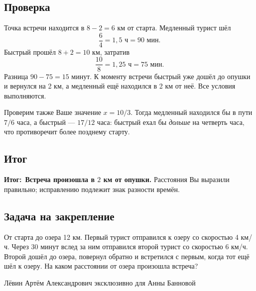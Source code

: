 \documentclass[a4paper,12pt]{article}
\newcommand{\resultlabel}{\textcolor{accent}{\textbf{Итог:}}}
\newcommand{\footerline}{%
  \par\vfill\begin{center}\small\color{muted}
  Лёвин Артём Александрович эксклюзивно для Анны Банновой
  \end{center}}
\begin{document}
\subsection*{Проверка}
Точка встречи находится в $8-2=6$ км от старта. Медленный турист шёл
\[
 \frac64=1{,}5\text{ ч}=90\text{ мин}.
\]
Быстрый прошёл $8+2=10$ км, затратив
\[
 \frac{10}{8}=1{,}25\text{ ч}=75\text{ мин}.
\]
Разница $90-75=15$ минут. К моменту встречи быстрый уже дошёл до опушки и вернулся на 2 км, а медленный ещё находился в 2 км от неё. Все условия выполняются.

Проверим также Ваше значение $x=10/3$. Тогда медленный находился бы в пути $7/6$ часа, а быстрый --- $17/12$ часа: быстрый ехал бы \emph{дольше} на четверть часа, что противоречит более позднему старту.

\subsection*{Итог}
\resultlabel\ \textbf{Встреча произошла в $2$ км от опушки.} Расстояния Вы выразили правильно; исправлению подлежит знак разности времён.

\subsection*{Задача на закрепление}
От старта до озера 12 км. Первый турист отправился к озеру со скоростью 4 км/ч. Через 30 минут вслед за ним отправился второй турист со скоростью 6 км/ч. Второй дошёл до озера, повернул обратно и встретился с первым, когда тот ещё шёл к озеру. На каком расстоянии от озера произошла встреча?

\footerline
\end{document}
